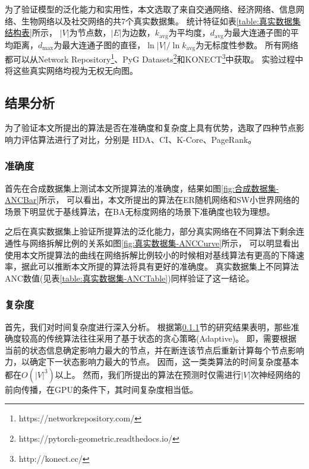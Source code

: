 \documentclass[twocolumn]{morningstar}
\begin{document}


为了验证模型的泛化能力和实用性，本文选取了来自交通网络、经济网络、信息网络、生物网络以及社交网络的共7个真实数据集。
统计特征如表\ref{table:真实数据集结构表}所示，
$|V|$为节点数，$|E|$为边数，$k_{\mathrm{avg}}$为平均度，$d_{\mathrm{avg}}$为最大连通子图的平均距离，$d_{\mathrm{max}}$为最大连通子图的直径，$\ln |V|/\ln k_\mathrm{avg}$为无标度性参数。
所有网络都可以从Network Repository\footnote{https://networkrepository.com/}、PyG Datasets\footnote{https://pytorch-geometric.readthedocs.io/}和KONECT\footnote{http://konect.cc/}中获取。
实验过程中将这些真实网络均视为无权无向图。


\subsection{结果分析}\label{sec:ResultAnalysis}

为了验证本文所提出的算法是否在准确度和复杂度上具有优势，选取了四种节点影响力评估算法进行了对比，分别是
HDA\cite{cohen2001HDA}、CI、K-Core、PageRank。

\subsubsection{准确度}\label{sec:Accuracy}

首先在合成数据集上测试本文所提算法的准确度，结果如图\ref{fig:合成数据集-ANCBar}所示，
可以看出，本文所提出的算法在ER随机网络和SW小世界网络的场景下明显优于基线算法，在BA无标度网络的场景下准确度也较为理想。

之后在真实数据集上验证所提算法的泛化能力，部分真实网络在不同算法下剩余连通性与网络拆解比例的关系如图\ref{fig:真实数据集-ANCCurve}所示，
可以明显看出使用本文所提算法的曲线在网络拆解比例较小的时候相对基线算法有更高的下降速率，据此可以推断本文所提的算法将具有更好的准确度。
真实数据集上不同算法ANC数值(见表\ref{table:真实数据集-ANCTable})同样验证了这一结论。






\subsubsection{复杂度}\label{sec:Complexity}

首先，我们对时间复杂度进行深入分析。
根据第\ref{sec:Accuracy}节的研究结果表明，那些准确度较高的传统算法往往采用了基于状态的贪心策略(Adaptive)。
即，需要根据当前的状态信息确定影响力最大的节点，并在断连该节点后重新计算每个节点影响力，以确定下一状态影响力最大的节点。
因而，这一类类算法的时间复杂度基本都在$O(|V|^3)$以上。
然而，我们所提出的算法在预测时仅需进行$|V|$次神经网络的前向传播，在GPU的条件下，其时间复杂度相当低。
\end{document}
